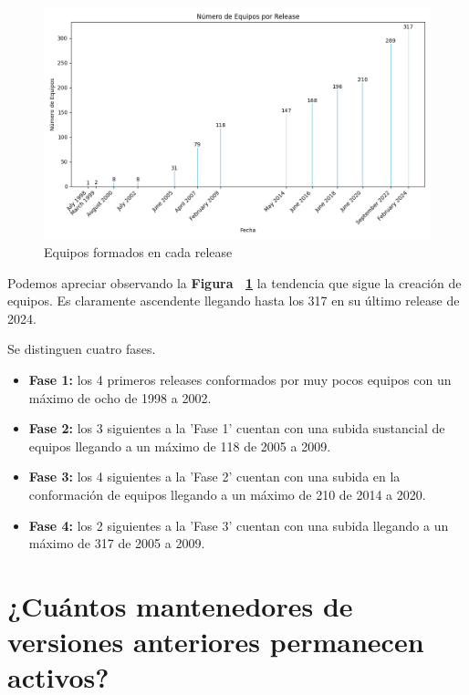 \documentclass[a4paper, 12pt]{book}
\begin{document}
\begin{figure}
	\centering
	\includegraphics[width=15cm, keepaspectratio]{img/Figura3_buena_equipos.png}
	\caption{Equipos formados en cada release}
	\label{fig:equipos}
\end{figure}

Podemos apreciar observando la \textbf{Figura ~\ref{fig:equipos}} la tendencia que sigue la creación de equipos. Es claramente ascendente llegando hasta los 317 en su último release de 2024.

Se distinguen cuatro fases.
\begin{itemize}
	\item  \textbf{Fase 1:} los 4 primeros releases conformados por muy pocos equipos con un máximo de ocho de 1998 a 2002. 
	
	\item  \textbf{Fase 2:} los 3 siguientes a la 'Fase 1' cuentan con una subida sustancial de equipos llegando a un máximo de 118 de 2005 a 2009.
	
	\item  \textbf{Fase 3:} los 4 siguientes a la 'Fase 2' cuentan con una subida en la conformación de equipos llegando a un máximo de 210 de 2014 a 2020.
	
	\item  \textbf{Fase 4:} los 2 siguientes a la 'Fase 3' cuentan con una subida  llegando a un máximo de 317 de 2005 a 2009.
	
\end{itemize}

\section{¿Cuántos mantenedores de versiones anteriores permanecen activos?}
\label{sec:pregunta_3}
\end{document}
